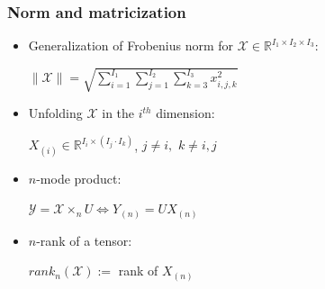 \documentclass{beamer}
\begin{document}

\begin{frame}
\frametitle{Norm and matricization}
\begin{itemize}
\item Generalization of Frobenius norm for $\mathcal{X}\in \mathbb{R}^{I_1\times I_2 \times I_3}$:\\ \begin{center} $\| \mathcal{X} \|=\sqrt{\sum\limits_{i=1}^{I_1}\sum\limits_{j=1}^{I_2}\sum\limits_{k=3}^{I_3}x_{i,j,k}^2}$\end{center}
\item Unfolding $ \mathcal{X}$ in the $i^{th}$ dimension:\\ \begin{center} $X_{(i)}\in \mathbb{R}^{I_i\times (I_j\cdot I_k)}$, $j\neq i,$ $k\neq i,j$  \end{center}
\item $n$-mode product:\\ \begin{center} $\mathcal{Y}=\mathcal{X}\times_n U \iff Y_{(n)}=UX_{(n)}$  \end{center}
\item $n$-rank of a tensor: \\ \begin{center} $rank_n(\mathcal{X}):=$ rank of $X_{(n)}$
\end{center}
\end{itemize} 
\end{frame}
\end{document}
